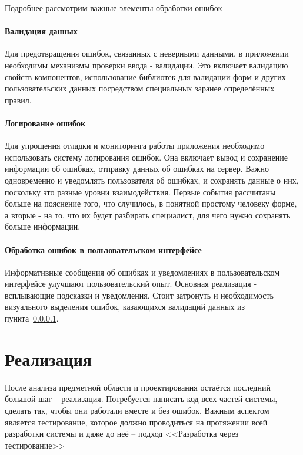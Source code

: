 \documentclass[a4paper,article]{article}
\begin{document}
    Подробнее рассмотрим важные элементы обработки ошибок

    \paragraph{Валидация данных}\label{Проектирование клиента. Валидация данных}

    Для предотвращения ошибок, связанных с неверными данными, в приложении необходимы механизмы проверки ввода - валидации. Это включает валидацию свойств компонентов, использование библиотек для валидации форм и других пользовательских данных посредством специальных заранее определённых правил.

    \paragraph{Логирование ошибок}

    Для упрощения отладки и мониторинга работы приложения необходимо использовать систему логирования ошибок. Она включает вывод и сохранение информации об ошибках, отправку данных об ошибках на сервер. Важно одновременно и уведомлять пользователя об ошибках, и сохранять данные о них, поскольку это разные уровни взаимодействия. Первые события рассчитаны больше на пояснение того, что случилось, в понятной простому человеку форме, а вторые - на то, что их будет разбирать специалист, для чего нужно сохранять больше информации.

    \paragraph{Обработка ошибок в пользовательском интерфейсе}

    Информативные сообщения об ошибках и уведомлениях в пользовательском интерфейсе улучшают пользовательский опыт. Основная реализация - всплывающие подсказки и уведомления. Стоит затронуть и необходимость визуального выделения ошибок, казающихся валидаций данных из пункта~\ref{Проектирование клиента. Валидация данных}.

    \newpage

    \section{Реализация}\label{Реализация}

    После анализа предметной области и проектирования остаётся последний большой шаг -- реализация. Потребуется написать код всех частей системы, сделать так, чтобы они работали вместе и без ошибок. Важным аспектом является тестирование, которое должно проводиться на протяжении всей разработки системы и даже до неё -- подход <<Разработка через тестирование>>
\end{document}
